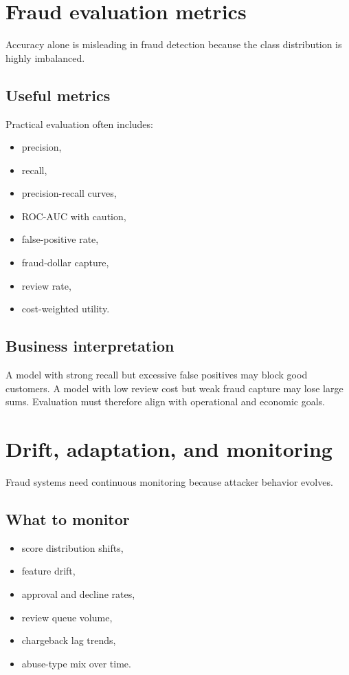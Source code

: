 \section{Fraud evaluation metrics}
Accuracy alone is misleading in fraud detection because the class distribution is highly imbalanced.

\subsection{Useful metrics}
Practical evaluation often includes:
\begin{itemize}
  \item precision,
  \item recall,
  \item precision-recall curves,
  \item ROC-AUC with caution,
  \item false-positive rate,
  \item fraud-dollar capture,
  \item review rate,
  \item cost-weighted utility.
\end{itemize}

\subsection{Business interpretation}
A model with strong recall but excessive false positives may block good customers.
A model with low review cost but weak fraud capture may lose large sums.
Evaluation must therefore align with operational and economic goals.

\section{Drift, adaptation, and monitoring}
Fraud systems need continuous monitoring because attacker behavior evolves.

\subsection{What to monitor}
\begin{itemize}
  \item score distribution shifts,
  \item feature drift,
  \item approval and decline rates,
  \item review queue volume,
  \item chargeback lag trends,
  \item abuse-type mix over time.
\end{itemize}

